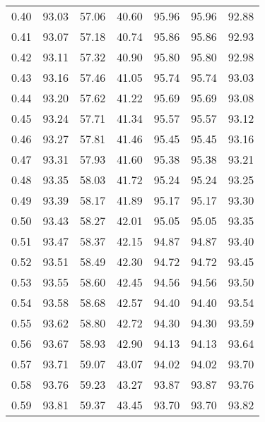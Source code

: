 \begin{tabular}{|c|c|c|c|c|c|c|}
      0.40 &     93.03 &     57.06 &      40.60 &   95.96 &      95.96 &         92.88 \\
      0.41 &     93.07 &     57.18 &      40.74 &   95.86 &      95.86 &         92.93 \\
      0.42 &     93.11 &     57.32 &      40.90 &   95.80 &      95.80 &         92.98 \\
      0.43 &     93.16 &     57.46 &      41.05 &   95.74 &      95.74 &         93.03 \\
      0.44 &     93.20 &     57.62 &      41.22 &   95.69 &      95.69 &         93.08 \\
      0.45 &     93.24 &     57.71 &      41.34 &   95.57 &      95.57 &         93.12 \\
      0.46 &     93.27 &     57.81 &      41.46 &   95.45 &      95.45 &         93.16 \\
      0.47 &     93.31 &     57.93 &      41.60 &   95.38 &      95.38 &         93.21 \\
      0.48 &     93.35 &     58.03 &      41.72 &   95.24 &      95.24 &         93.25 \\
      0.49 &     93.39 &     58.17 &      41.89 &   95.17 &      95.17 &         93.30 \\
      0.50 &     93.43 &     58.27 &      42.01 &   95.05 &      95.05 &         93.35 \\
      0.51 &     93.47 &     58.37 &      42.15 &   94.87 &      94.87 &         93.40 \\
      0.52 &     93.51 &     58.49 &      42.30 &   94.72 &      94.72 &         93.45 \\
      0.53 &     93.55 &     58.60 &      42.45 &   94.56 &      94.56 &         93.50 \\
      0.54 &     93.58 &     58.68 &      42.57 &   94.40 &      94.40 &         93.54 \\
      0.55 &     93.62 &     58.80 &      42.72 &   94.30 &      94.30 &         93.59 \\
      0.56 &     93.67 &     58.93 &      42.90 &   94.13 &      94.13 &         93.64 \\
      0.57 &     93.71 &     59.07 &      43.07 &   94.02 &      94.02 &         93.70 \\
      0.58 &     93.76 &     59.23 &      43.27 &   93.87 &      93.87 &         93.76 \\
      0.59 &     93.81 &     59.37 &      43.45 &   93.70 &      93.70 &         93.82 \\

\end{tabular}
